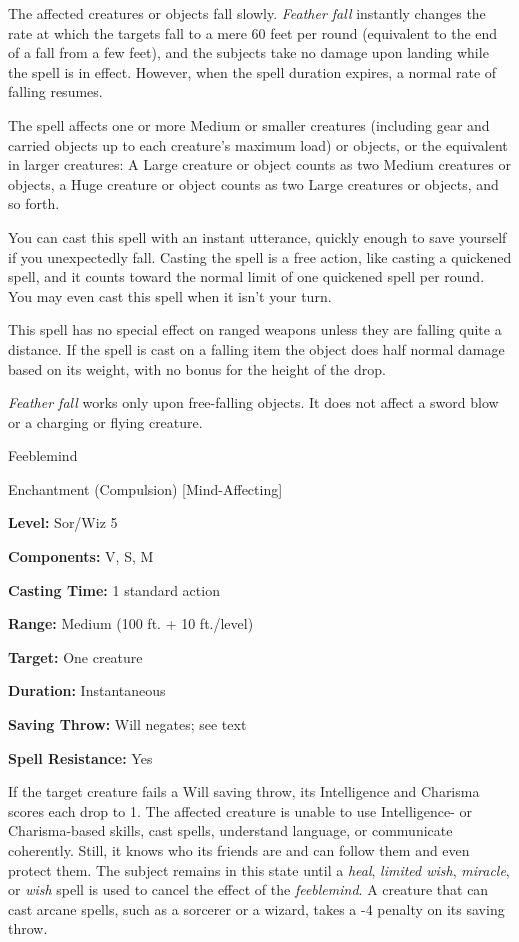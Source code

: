 \documentclass{article}
\begin{document}
The affected creatures or objects fall slowly. \textit{Feather fall }instantly 
changes the rate at which the targets fall to a mere 60 feet per round (equivalent 
to the end of a fall from a few feet), and the subjects take no damage upon landing 
while the spell is in effect. However, when the spell duration expires, a normal 
rate of falling resumes.

The spell affects one or more Medium or smaller creatures (including gear and carried 
objects up to each creature's maximum load) or objects, or the equivalent in larger 
creatures: A Large creature or object counts as two Medium creatures or objects, 
a Huge creature or object counts as two Large creatures or objects, and so forth.

You can cast this spell with an instant utterance, quickly enough to save yourself 
if you unexpectedly fall. Casting the spell is a free action, like casting a quickened 
spell, and it counts toward the normal limit of one quickened spell per round. 
You may even cast this spell when it isn't your turn.

This spell has no special effect on ranged weapons unless they are falling quite 
a distance. If the spell is cast on a falling item the object does half normal 
damage based on its weight, with no bonus for the height of the drop.

\textit{Feather fall }works only upon free-falling objects. It does not affect 
a sword blow or a charging or flying creature.

\vspace{12pt}
Feeblemind

Enchantment (Compulsion) [Mind-Affecting]

\textbf{Level:} Sor/Wiz 5

\textbf{Components:} V, S, M

\textbf{Casting Time:} 1 standard action

\textbf{Range: }Medium (100 ft. + 10 ft./level)

\textbf{Target:} One creature

\textbf{Duration:} Instantaneous

\textbf{Saving Throw: }Will negates; see text

\textbf{Spell Resistance:} Yes

If the target creature fails a Will saving throw, its Intelligence and Charisma 
scores each drop to 1. The affected creature is unable to use Intelligence- or 
Charisma-based skills, cast spells, understand language, or communicate coherently. 
Still, it knows who its friends are and can follow them and even protect them. 
The subject remains in this state until a \textit{heal}, \textit{limited wish}, 
\textit{miracle}, or \textit{wish }spell is used to cancel the effect of the \textit{feeblemind}. 
A creature that can cast arcane spells, such as a sorcerer or a wizard, takes a 
-4 penalty on its saving throw.
\end{document}
